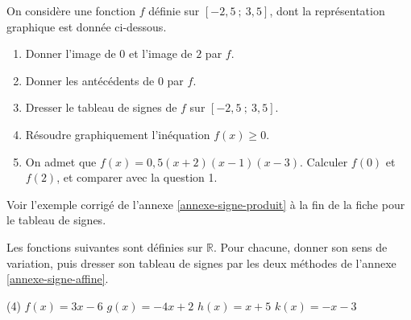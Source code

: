 \documentclass[10pt,a4paper]{article}
\begin{document}
\begin{bloc}
\begin{exo}
On considère une fonction \(f\) définie sur \([-2,5\ ;\ 3,5]\), dont la représentation graphique est donnée ci-dessous.

\begin{center}
\end{center}

\begin{enumerate}[leftmargin=*]
    \item Donner l'image de \(0\) et l'image de \(2\) par \(f\).
    \item Donner les antécédents de \(0\) par \(f\).
    \item Dresser le tableau de signes de \(f\) sur \([-2,5\ ;\ 3,5]\).
    \item Résoudre graphiquement l'inéquation \(f(x)\geq 0\).
    \item On admet que \(f(x)=0,5(x+2)(x-1)(x-3)\). Calculer \(f(0)\) et \(f(2)\), et comparer avec la question 1.
\end{enumerate}
\end{exo}

\begin{indication}
    Voir l'exemple corrigé de l'annexe \ref{annexe-signe-produit} à la fin de la fiche pour le tableau de signes.
\end{indication}
\end{bloc}

\begin{bloc}
\begin{exo}
Les fonctions suivantes sont définies sur \(\mathbb{R}\). Pour chacune, donner son sens de variation, puis dresser son tableau de signes par les deux méthodes de l'annexe \ref{annexe-signe-affine}.
\begin{tasks}(4)
    \task \(f(x)=3x-6\)
    \task \(g(x)=-4x+2\)
    \task \(h(x)=x+5\)
    \task \(k(x)=-x-3\)
\end{tasks}
\end{exo}
\end{bloc}
\end{document}
